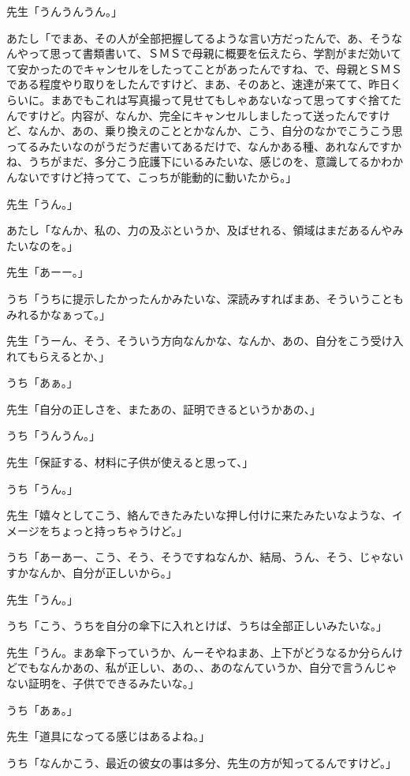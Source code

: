 \documentclass[b5j,twoside,twocolumn]{utarticle}
\begin{document}
\begin{description}
\item 先生「うんうんうん。」
\item あたし「でまあ、その人が全部把握してるような言い方だったんで、あ、そうなんやって思って書類書いて、ＳＭＳで母親に概要を伝えたら、学割がまだ効いてて安かったのでキャンセルをしたってことがあったんですね、で、母親とＳＭＳである程度やり取りをしたんですけど、まあ、そのあと、速達が来てて、昨日くらいに。まあでもこれは写真撮って見せてもしゃあないなって思ってすぐ捨てたんですけど。内容が、なんか、完全にキャンセルしましたって送ったんですけど、なんか、あの、乗り換えのこととかなんか、こう、自分のなかでこうこう思ってるみたいなのがうだうだ書いてあるだけで、なんかある種、あれなんですかね、うちがまだ、多分こう庇護下にいるみたいな、感じのを、意識してるかわかんないですけど持ってて、こっちが能動的に動いたから。」
\item 先生「うん。」
\item あたし「なんか、私の、力の及ぶというか、及ばせれる、領域はまだあるんやみたいなのを。」
\item 先生「あーー。」
\item うち「うちに提示したかったんかみたいな、深読みすればまあ、そういうこともみれるかなぁって。」
\item 先生「うーん、そう、そういう方向なんかな、なんか、あの、自分をこう受け入れてもらえるとか、」
\item うち「あぁ。」
\item 先生「自分の正しさを、またあの、証明できるというかあの、」
\item うち「うんうん。」
\item 先生「保証する、材料に子供が使えると思って、」
\item うち「うん。」
\item 先生「嬉々としてこう、絡んできたみたいな押し付けに来たみたいなような、イメージをちょっと持っちゃうけど。」
\item うち「あーあー、こう、そう、そうですねなんか、結局、うん、そう、じゃないすかなんか、自分が正しいから。」
\item 先生「うん。」
\item うち「こう、うちを自分の傘下に入れとけば、うちは全部正しいみたいな。」
\item 先生「うん。まあ傘下っていうか、んーそやねまあ、上下がどうなるか分らんけどでもなんかあの、私が正しい、あの、、あのなんていうか、自分で言うんじゃない証明を、子供でできるみたいな。」
\item うち「あぁ。」
\item 先生「道具になってる感じはあるよね。」
\item うち「なんかこう、最近の彼女の事は多分、先生の方が知ってるんですけど。」

\end{description}
\end{document}

